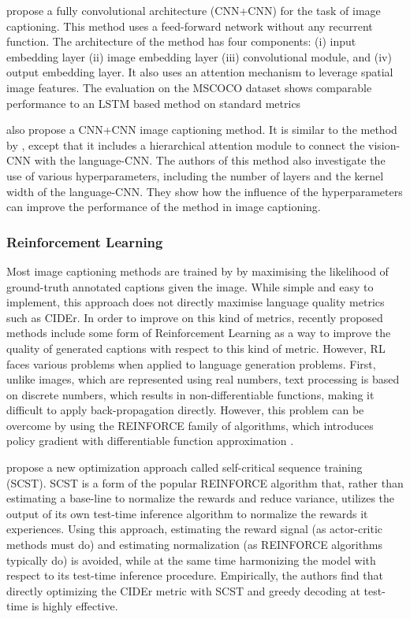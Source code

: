 \cite{Aneja2018} propose a fully convolutional architecture (CNN+CNN) for the task of image captioning. This method uses a feed-forward network without any recurrent function. The architecture of the method has four components: (i) input embedding layer (ii) image embedding layer (iii) convolutional module, and (iv) output embedding layer. It also uses an attention mechanism to leverage spatial image features. The evaluation on the MSCOCO dataset shows comparable performance to an LSTM based method on standard metrics

\citet{Wang2018} also propose a CNN+CNN image captioning method. It is similar to the method by \citeauthor{Aneja2018}, except that it includes a hierarchical attention module to connect the vision-CNN with the language-CNN. The authors of this method also investigate the use of various hyperparameters, including the number of layers and the kernel width of the language-CNN. They show how the influence of the hyperparameters can improve the performance of the method in image captioning.

\subsubsection{Reinforcement Learning}

Most image captioning methods are trained by by maximising the likelihood of ground-truth annotated captions given the image. While simple and easy to implement, this approach does not directly maximise language quality metrics such as CIDEr. In order to improve on this kind of metrics, recently proposed methods include some form of Reinforcement Learning as a way to improve the quality of generated captions with respect to this kind of metric. However, RL faces various problems when applied to language generation problems. First, unlike images, which are represented using real numbers, text processing is based on discrete numbers, which results in non-differentiable functions, making it difficult to apply back-propagation directly. However, this problem can be overcome by using the REINFORCE family of algorithms, which introduces policy gradient with differentiable function approximation \citep{Sutton1999}.

\cite{Rennie2017} propose a new optimization approach called self-critical sequence training (SCST). SCST is a form of the popular REINFORCE algorithm that, rather than estimating a base-line to normalize the rewards and reduce variance, utilizes the output of its own test-time inference algorithm to normalize the rewards it experiences. Using this approach, estimating the reward signal (as actor-critic methods must do) and estimating normalization (as REINFORCE algorithms typically do) is avoided, while at the same time harmonizing the model with respect to its test-time inference procedure. Empirically, the authors find that directly optimizing the CIDEr metric with SCST and greedy decoding at test-time is highly effective.

